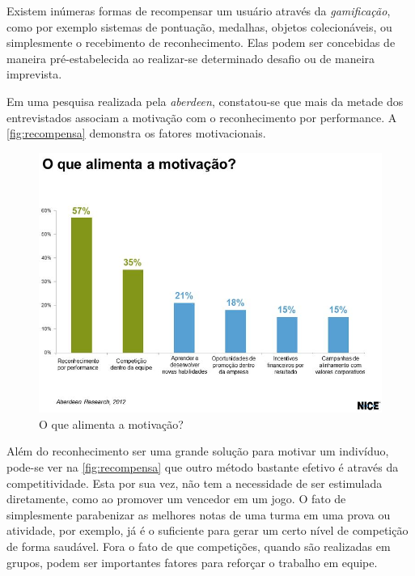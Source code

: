 \documentclass[
    12pt,               %
    openright,          %
    oneside,
    a4paper,            %
    english,            %
    brazil              %
    ]{ifsp-spo-inf-ctds} %
\begin{document}
Existem inúmeras formas de recompensar um usuário através da \textit{gamificação}, como por exemplo sistemas de pontuação, medalhas, objetos colecionáveis, ou simplesmente o recebimento de reconhecimento. Elas podem ser concebidas de maneira pré-estabelecida ao realizar-se determinado desafio ou de maneira imprevista.


Em uma pesquisa realizada pela \textit{\gls{aberdeen}}, constatou-se que mais da metade dos entrevistados associam a motivação com o reconhecimento por performance. A \autoref{fig:recompensa} demonstra os fatores motivacionais.

\begin{figure}[htb]
    \centering
	\includegraphics[width=16cm]{imagens/recompensa.jpg}
	\caption{\label{fig:recompensa}O que alimenta a motivação?}
\end{figure}

Além do reconhecimento ser uma grande solução para motivar um indivíduo, pode-se ver na \autoref{fig:recompensa} que outro método bastante efetivo é através da competitividade. Esta por sua vez, não tem a necessidade de ser estimulada diretamente, como ao promover um vencedor em um jogo. O fato de simplesmente parabenizar as melhores notas de uma turma em uma prova ou atividade, por exemplo, já é o suficiente para gerar um certo nível de competição de forma saudável. Fora o fato de que competições, quando são realizadas em grupos, podem ser importantes fatores para reforçar o trabalho em equipe.

\FloatBarrier
\end{document}
